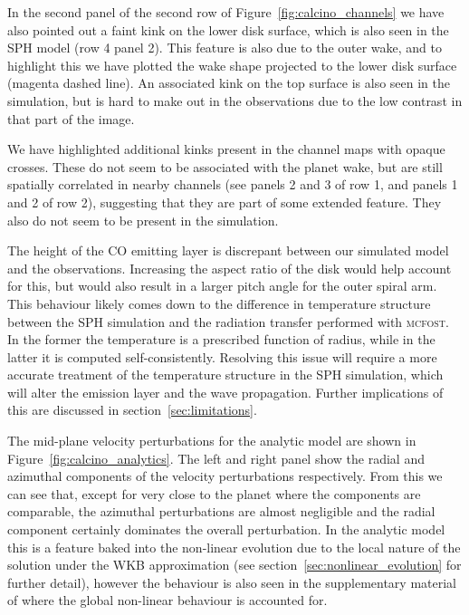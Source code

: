 In the second panel of the second row of Figure~\ref{fig:calcino_channels} we have also pointed out a faint kink on the lower disk surface, which is also seen in the SPH model (row 4 panel 2).
This feature is also due to the outer wake, and to highlight this we have plotted the wake shape projected to the lower disk surface (magenta dashed line).
An associated kink on the top surface is also seen in the simulation, but is hard to make out in the observations due to the low contrast in that part of the image.

We have highlighted additional kinks present in the channel maps with opaque crosses.
These do not seem to be associated with the planet wake, but are still spatially correlated in nearby channels (see panels 2 and 3 of row 1, and panels 1 and 2 of row 2), suggesting that they are part of some extended feature.
They also do not seem to be present in the simulation.

The height of the CO emitting layer is discrepant between our simulated model and the observations.
Increasing the aspect ratio of the disk would help account for this, but would also result in a larger pitch angle for the outer spiral arm.
This behaviour likely comes down to the difference in temperature structure between the SPH simulation and the radiation transfer performed with \textsc{mcfost}.
In the former the temperature is a prescribed function of radius, while in the latter it is computed self-consistently.
Resolving this issue will require a more accurate treatment of the temperature structure in the SPH simulation, which will alter the emission layer and the wave propagation.
Further implications of this are discussed in section~\ref{sec:limitations}.

The mid-plane velocity perturbations for the analytic model are shown in Figure~\ref{fig:calcino_analytics}.
The left and right panel show the radial and azimuthal components of the velocity perturbations respectively.
From this we can see that, except for very close to the planet where the components are comparable, the azimuthal perturbations are almost negligible and the radial component certainly dominates the overall perturbation.
In the analytic model this is a feature baked into the non-linear evolution due to the local nature of the solution under the WKB approximation (see section~\ref{sec:nonlinear_evolution} for further detail), however the behaviour is also seen in the supplementary material of \citet{pinte2019} where the global non-linear behaviour is accounted for.

